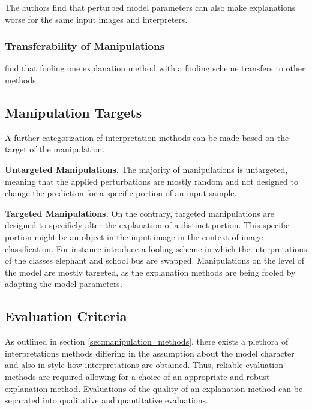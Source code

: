 The authors find that perturbed model parameters can also make explanations worse for the same input images and interpreters. 



\subsubsection{Transferability of Manipulations}
\cite{fooling_nn_interpreters} find that fooling one explanation method with a fooling scheme transfers to other methods. 


\subsection{Manipulation Targets}
\label{subsec:manipulation_targets}
A further categorization ef interpretation methods can be made based on the target of the manipulation. 

\noindent\textbf{Untargeted Manipulations.} 
The majority of manipulations is untargeted, meaning that the applied perturbations are mostly random and not designed to change the prediction for a specific portion of an input sample. 

\noindent\textbf{Targeted Manipulations.} 
On the contrary, targeted manipulations are designed to specificly alter the explanation of a distinct portion. This specific portion might be an object in the input image in the context of image classification. 
For instance \cite{fooling_nn_interpreters} introduce a fooling scheme in which the interpretations of the classes elephant and school bus are swapped. 
Manipulations on the level of the model are mostly targeted, as the explanation methods are being fooled by adapting the model parameters. 




\subsection{Evaluation Criteria}
\label{subsec:evaluation_criteria}
As outlined in section \autoref{sec:manipulation_methods}, there exists a plethora of interpretations methods differing in the assumption about the model character and also in style how interpretations are obtained. Thus, reliable evaluation methods are required allowing for a choice of an appropriate and robust explanation method. 
Evaluations of the quality of an explanation method can be separated into qualitative and quantitative evaluations. 



